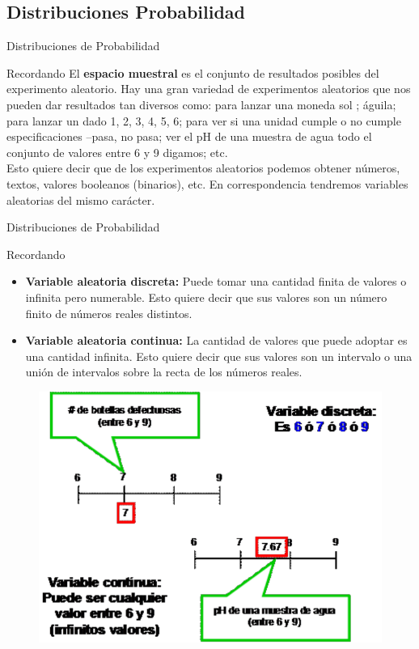 \documentclass[11pt]{beamer}
\begin{document}
      \subsection*{Distribuciones Probabilidad}
        \begin{frame}{Distribuciones de Probabilidad}
            \begin{block}{Recordando}
              El \textbf{espacio muestral} es el conjunto de resultados posibles del experimento aleatorio. Hay una gran variedad de experimentos aleatorios que nos pueden dar resultados tan diversos como: para lanzar una moneda  {sol ; águila}; para lanzar un dado  {1, 2, 3, 4, 5, 6}; para ver si una unidad cumple o no cumple especificaciones –{pasa, no pasa}; ver el pH de una muestra de agua {todo el conjunto de valores entre 6 y 9 digamos}; etc. \\
              Esto quiere decir que de los experimentos aleatorios podemos obtener números, textos, valores booleanos (binarios), etc. En correspondencia tendremos variables aleatorias del mismo carácter.\\
            \end{block}
        \end{frame}


        \begin{frame}{Distribuciones de Probabilidad}
            \begin{block}{Recordando}
                \begin{itemize}
                    \item \textbf{Variable aleatoria discreta:} Puede tomar una cantidad finita de valores o infinita pero numerable. Esto quiere decir que sus valores son un número finito de números reales distintos.
                    \item  \textbf{Variable aleatoria continua:} La cantidad de valores que puede adoptar es una cantidad infinita. Esto quiere decir que sus valores son un intervalo o una unión de intervalos sobre la recta de los números reales.
                \end{itemize}
            \end{block}
            \begin{figure}
                \centering
                \includegraphics[width=0.3\linewidth]{images/estadistica8}
                \label{fig:estadistica8}
            \end{figure}

        \end{frame}
\end{document}

